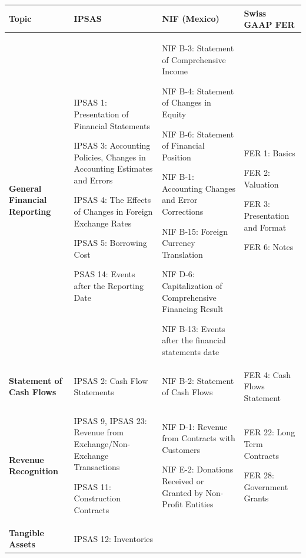 \documentclass[10pt]{article}
\begin{document}
\begin{center}
\begin{longtable}{|>{\raggedright\arraybackslash}p{2.5cm}|>{\raggedright\arraybackslash}p{5cm}|>{\raggedright\arraybackslash}p{4cm}|>{\raggedright\arraybackslash}p{3cm}|}
\hline
\rowcolor[HTML]{D9D9D9}\textbf{Topic} &\textbf{IPSAS} &\textbf{NIF (Mexico)} &\textbf{Swiss GAAP FER} \\ 
\hline
\endhead
\hline
\textbf{General Financial Reporting} & IPSAS 1: Presentation of Financial Statements

IPSAS 3: Accounting Policies, Changes in Accounting Estimates and Errors

IPSAS 4: The Effects of Changes in Foreign Exchange Rates

IPSAS 5: Borrowing Cost

PSAS 14: Events after the Reporting Date

 & NIF B-3: Statement of Comprehensive Income

NIF B-4: Statement of Changes in Equity

NIF B-6: Statement of Financial Position

NIF B-1: Accounting Changes and Error Corrections

NIF B-15: Foreign Currency Translation

NIF D-6: Capitalization of Comprehensive Financing Result

NIF B-13: Events after the financial statements date

 & FER 1: Basics

FER 2: Valuation

FER 3: Presentation and Format

FER 6: Notes

 \\
\hline
\textbf{Statement of Cash Flows} & IPSAS 2: Cash Flow Statements & NIF B-2: Statement of Cash Flows & FER 4: Cash Flows Statement \\
\hline
\textbf{Revenue Recognition} & IPSAS 9, IPSAS 23: Revenue from Exchange/Non-Exchange Transactions

IPSAS 11: Construction Contracts

 & NIF D-1: Revenue from Contracts with Customers

NIF E-2: Donations Received or Granted by Non-Profit Entities

 & FER 22: Long Term Contracts

FER 28: Government Grants

 \\
\hline
\textbf{Tangible Assets} & IPSAS 12: Inventories


\end{longtable}
\end{center}
\end{document}

